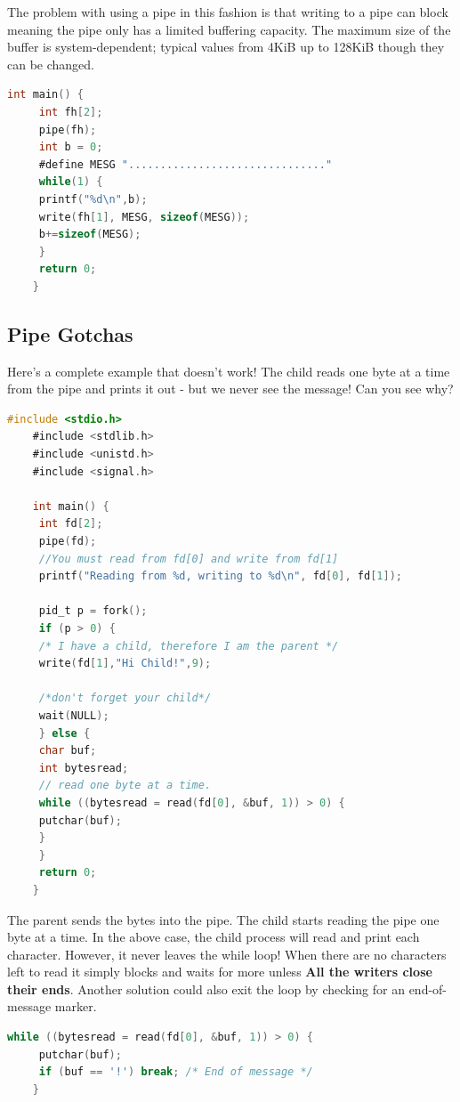 The problem with using a pipe in this fashion is that writing to a pipe can block meaning the pipe only has a limited buffering capacity.
The maximum size of the buffer is system-dependent; typical values from 4KiB up to 128KiB though they can be changed.
	 
\begin{lstlisting}[language=C]
	int main() {
	 int fh[2];
	 pipe(fh);
	 int b = 0;
	 #define MESG "..............................."
	 while(1) {
	 printf("%d\n",b);
	 write(fh[1], MESG, sizeof(MESG));
	 b+=sizeof(MESG);
	 }
	 return 0;
	}
\end{lstlisting}
	 
\subsection{Pipe Gotchas}
	 
Here's a complete example that doesn't work!
The child reads one byte at a time from the pipe and prints it out - but we never see the message!
Can you see why?
	 
\begin{lstlisting}[language=C]
	#include <stdio.h>
	#include <stdlib.h>
	#include <unistd.h>
	#include <signal.h>
	 
	int main() {
	 int fd[2];
	 pipe(fd);
	 //You must read from fd[0] and write from fd[1]
	 printf("Reading from %d, writing to %d\n", fd[0], fd[1]);
	 
	 pid_t p = fork();
	 if (p > 0) {
	 /* I have a child, therefore I am the parent */
	 write(fd[1],"Hi Child!",9);
	 
	 /*don't forget your child*/
	 wait(NULL);
	 } else {
	 char buf;
	 int bytesread;
	 // read one byte at a time.
	 while ((bytesread = read(fd[0], &buf, 1)) > 0) {
	 putchar(buf);
	 }
	 }
	 return 0;
	}
\end{lstlisting}
	 
The parent sends the bytes  into the pipe.
The child starts reading the pipe one byte at a time.
In the above case, the child process will read and print each character.
However, it never leaves the while loop!
When there are no characters left to read it simply blocks and waits for more unless \textbf{All the writers close their ends}.
Another solution could also exit the loop by checking for an end-of-message marker.
	 
\begin{lstlisting}[language=C]
	while ((bytesread = read(fd[0], &buf, 1)) > 0) {
	 putchar(buf);
	 if (buf == '!') break; /* End of message */
	}
\end{lstlisting}
	 
